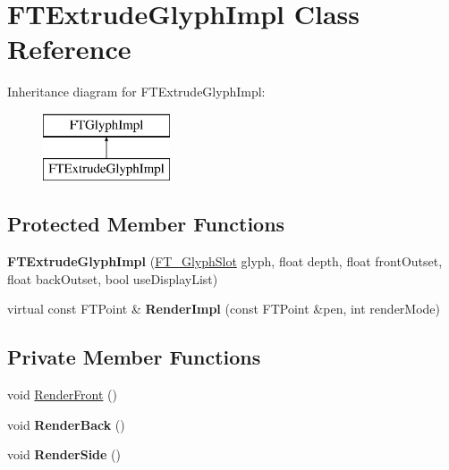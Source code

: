 \hypertarget{class_f_t_extrude_glyph_impl}{}\section{F\+T\+Extrude\+Glyph\+Impl Class Reference}
\label{class_f_t_extrude_glyph_impl}
Inheritance diagram for F\+T\+Extrude\+Glyph\+Impl\+:\begin{figure}[H]
\begin{center}
\leavevmode
\includegraphics[height=2.000000cm]{class_f_t_extrude_glyph_impl}
\end{center}
\end{figure}
\subsection*{Protected Member Functions}
\begin{DoxyCompactItemize}
\item 
{\bfseries F\+T\+Extrude\+Glyph\+Impl} (\hyperlink{struct_f_t___glyph_slot_rec__}{F\+T\+\_\+\+Glyph\+Slot} glyph, float depth, float front\+Outset, float back\+Outset, bool use\+Display\+List)\hypertarget{class_f_t_extrude_glyph_impl_adbfa8d05122539318f6caa8b77a5c291}{}\label{class_f_t_extrude_glyph_impl_adbfa8d05122539318f6caa8b77a5c291}

\item 
virtual const F\+T\+Point \& {\bfseries Render\+Impl} (const F\+T\+Point \&pen, int render\+Mode)\hypertarget{class_f_t_extrude_glyph_impl_a7ba3363d6764a14a6954f068f626029b}{}\label{class_f_t_extrude_glyph_impl_a7ba3363d6764a14a6954f068f626029b}

\end{DoxyCompactItemize}
\subsection*{Private Member Functions}
\begin{DoxyCompactItemize}
\item 
void \hyperlink{class_f_t_extrude_glyph_impl_ab358d7adaae1721f6254711614689362}{Render\+Front} ()
\item 
void {\bfseries Render\+Back} ()\hypertarget{class_f_t_extrude_glyph_impl_a6ee866293670c7c45fc6d485aaf32f8f}{}\label{class_f_t_extrude_glyph_impl_a6ee866293670c7c45fc6d485aaf32f8f}

\item 
void {\bfseries Render\+Side} ()\hypertarget{class_f_t_extrude_glyph_impl_abf77bb5e2891b08cacd01103b224acc6}{}\label{class_f_t_extrude_glyph_impl_abf77bb5e2891b08cacd01103b224acc6}

\end{DoxyCompactItemize}

